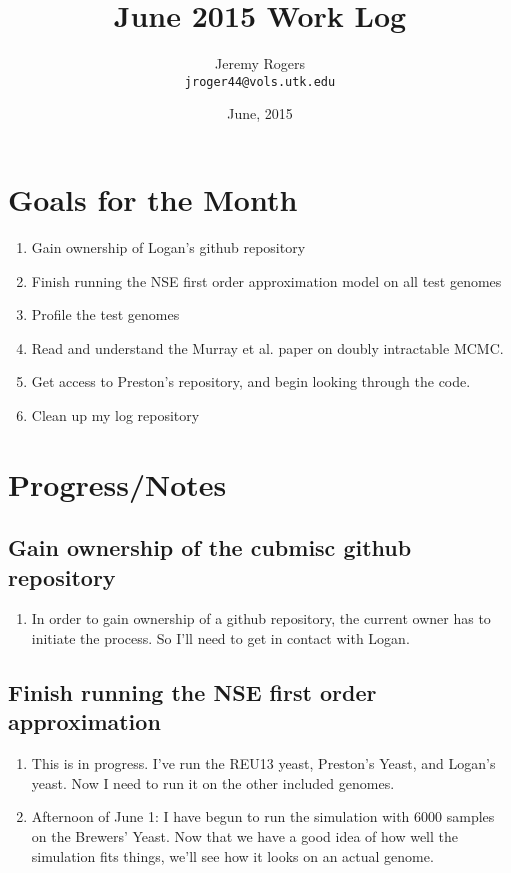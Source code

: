 \documentclass[12 pt]{article}
\title{June 2015 Work Log}
\author{Jeremy Rogers \\
	\texttt{jroger44@vols.utk.edu}}
\date{June, 2015}
\begin{document}
	\maketitle
	\tableofcontents
	
	\section{Goals for the Month}
	\begin{enumerate}
		\item Gain ownership of Logan's github repository
		\item Finish running the NSE first order approximation model on all test genomes
		\item Profile the test genomes
		\item Read and understand the Murray et al. paper on doubly intractable MCMC.
		\item Get access to Preston's repository, and begin looking through the code.
		\item Clean up my log repository
	\end{enumerate}
	\section{Progress/Notes}
	\subsection{Gain ownership of the cubmisc github repository}
	\begin{enumerate}
		\item In order to gain ownership of a github repository, the current owner has to initiate the process. So I'll need to get in contact with Logan.
	\end{enumerate}
	
	\subsection{Finish running the NSE first order approximation}
	\begin{enumerate}
	\item This is in progress. I've run the REU13 yeast, Preston's Yeast, and Logan's yeast. Now I need to run it on the other included genomes.
	\item Afternoon of June 1: I have begun to run the simulation with 6000 samples on the Brewers' Yeast. Now that we have a good idea of how well the simulation fits things, we'll see how it looks on an actual genome.
	\end{enumerate}
	
\end{document}
